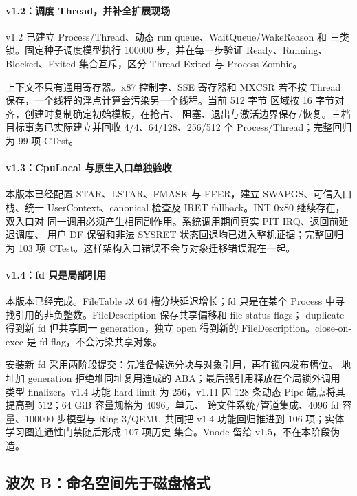 \paragraph{v1.2：调度 Thread，并补全扩展现场}

v1.2 已建立 Process/Thread、动态 run queue、WaitQueue/WakeReason 和
三类锁。固定种子调度模型执行 100000 步，并在每一步验证 Ready、Running、
Blocked、Exited 集合互斥，区分 Thread Exited 与 Process Zombie。

上下文不只有通用寄存器。x87 控制字、SSE 寄存器和 MXCSR 若不按 Thread
保存，一个线程的浮点计算会污染另一个线程。当前 512 字节
 区域按 16 字节对齐，创建时复制确定初始模板，在抢占、
阻塞、退出与激活边界保存/恢复。三档目标事务已实际建立并回收
4/4、64/128、256/512 个 Process/Thread；完整回归为 99 项 CTest。

\paragraph{v1.3：CpuLocal 与原生入口单独验收}

本版本已经配置 STAR、LSTAR、FMASK 与 EFER，建立 SWAPGS、可信入口栈、统一
UserContext、canonical 检查及 IRET fallback。INT 0x80 继续存在，双入口对
同一调用必须产生相同副作用。系统调用期间真实 PIT IRQ、返回前延迟调度、
用户 DF 保留和非法 SYSRET 状态回退均已进入整机证据；完整回归为
103 项 CTest。这样架构入口错误不会与对象迁移错误混在一起。

\paragraph{v1.4：fd 只是局部引用}

本版本已经完成。FileTable 以 64 槽分块延迟增长；fd 只是在某个 Process
中寻找引用的非负整数。FileDescription 保存共享偏移和 file status flags；
duplicate 得到新 fd 但共享同一 generation，独立 open 得到新的
FileDescription。close-on-exec 是 fd flag，不会污染共享对象。

安装新 fd 采用两阶段提交：先准备候选分块与对象引用，再在锁内发布槽位。
地址加 generation 拒绝堆同址复用造成的 ABA；最后强引用释放在全局锁外调用
类型 finalizer。v1.4 功能 hard limit 为 256，v1.11 因 128 条动态 Pipe
端点将其提高到 512；64 GiB 容量规格为 4096。单元、
跨文件系统/管道集成、4096 fd 容量、100000 步模型与 Ring 3/QEMU 共同把
v1.4 功能回归推进到 106 项；实体学习图连通性门禁随后形成 107 项历史
集合。Vnode 留给 v1.5，不在本阶段伪造。

\subsection{波次 B：命名空间先于磁盘格式}

